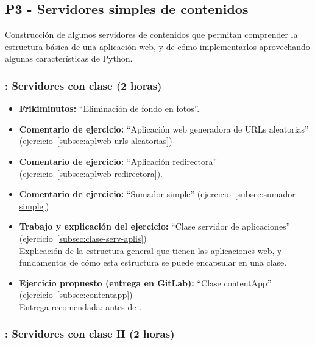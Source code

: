 \documentclass[a4paper,12pt]{article}
\begin{document}
\subsection{P3 - Servidores simples de contenidos}

Construcción de algunos servidores de contenidos que permitan comprender la estructura básica de una aplicación web, y de cómo implementarlos aprovechando algunas características de Python.

\subsubsection{\juevesE: Servidores con clase (2 horas)}
\label{cal:juevesE}

\begin{itemize}
\item \textbf{Frikiminutos:} ``Eliminación de fondo en fotos''.
\item \textbf{Comentario de ejercicio:} ``Aplicación web generadora de URLs aleatorias'' (ejercicio~\ref{subsec:aplweb-urls-aleatorias})
\item \textbf{Comentario de ejercicio:} ``Aplicación redirectora'' (ejercicio~\ref{subsec:aplweb-redirectora}).
\item \textbf{Comentario de ejercicio:} ``Sumador simple'' (ejercicio~\ref{subsec:sumador-simple}) 
\item \textbf{Trabajo y explicación del ejercicio:} ``Clase servidor de aplicaciones'' (ejercicio~\ref{subsec:clase-serv-aplis}) \\
  Explicación de la estructura general que tienen las aplicaciones web, y fundamentos de cómo esta estructura se puede encapsular en una clase.
\item \textbf{Ejercicio propuesto (entrega en GitLab):}  ``Clase contentApp'' (ejercicio~\ref{subsec:contentapp}) \\
  Entrega recomendada: antes de \juevesF.
\end{itemize}


\subsubsection{\juevesF: Servidores con clase II (2 horas)}
\label{cal:juevesF}
\end{document}
